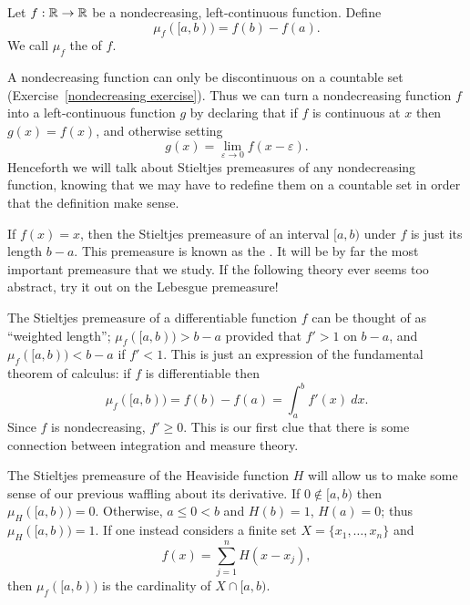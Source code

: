 \begin{definition}
Let $f: \mathbb{R} \to \mathbb{R}$ be a nondecreasing, left-continuous function.
Define
\[\mu_{f}([a, b)) = f(b) - f(a).\]
We call $\mu_{f}$ the  of $f$.
\end{definition}

\begin{subsec}
A nondecreasing function can only be discontinuous on a countable set (Exercise~\ref{nondecreasing exercise}).
Thus we can turn a nondecreasing function $f$ into a left-continuous function $g$ by declaring that if $f$ is continuous at $x$ then $g(x) = f(x)$, and otherwise setting
\[g(x) = \lim_{\varepsilon \to 0} f(x - \varepsilon).\]
Henceforth we will talk about Stieltjes premeasures of any nondecreasing function, knowing that we may have to redefine them on a countable set in order that the definition make sense.
\end{subsec}

\begin{example}
If $f(x) = x$, then the Stieltjes premeasure of an interval $[a, b)$ under $f$ is just its length $b - a$.
This premeasure is known as the .
It will be by far the most important premeasure that we study.
If the following theory ever seems too abstract, try it out on the Lebesgue premeasure!
\end{example}

\begin{example}
The Stieltjes premeasure of a differentiable function $f$ can be thought of as ``weighted length''; $\mu_{f}([a, b)) > b - a$ provided that $f' > 1$ on $b - a$, and $\mu_{f}([a, b)) < b - a$ if $f' < 1$.
This is just an expression of the fundamental theorem of calculus: if $f$ is differentiable then
\[\mu_{f}([a, b)) = f(b) - f(a) = \int_{a}^{b} f'(x)~dx.\]
Since $f$ is nondecreasing, $f' \geq 0$.
This is our first clue that there is some connection between integration and measure theory.
\end{example}

\begin{example}
The Stieltjes premeasure of the Heaviside function $H$ will allow us to make some sense of our previous waffling about its derivative.
If $0 \notin [a, b)$ then $\mu_{H}([a, b)) = 0$.
Otherwise, $a \leq 0 < b$ and $H(b) = 1$, $H(a) = 0$; thus $\mu_{H}([a, b)) = 1$.
If one instead considers a finite set $X = \{x_{1}, \dots, x_{n}\}$ and
\[f(x) = \sum_{j=1}^{n} H(x - x_{j}),\]
then $\mu_{f}([a, b))$ is the cardinality of $X \cap [a, b)$.
\end{example}


